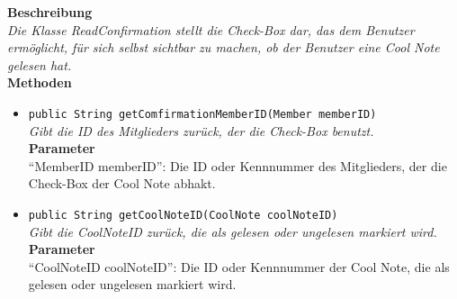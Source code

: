 	\textbf{Beschreibung} \\
	\textit{Die Klasse ReadConfirmation stellt die Check-Box dar, das dem Benutzer ermöglicht, für sich selbst sichtbar zu machen, ob der Benutzer eine Cool Note gelesen hat.} \\
	
	\textbf{Methoden}
	\begin{itemize}
		\item\texttt{{public String getComfirmationMemberID(Member memberID)}}\\
		\textit{Gibt die ID des Mitglieders zurück, der die Check-Box benutzt.}\\
		\textbf{Parameter}\\
		“MemberID memberID”: Die ID oder Kennnummer des Mitglieders, der die Check-Box der Cool Note abhakt.\\
		
		\item\texttt{{public String getCoolNoteID(CoolNote coolNoteID)}}\\
		\textit{Gibt die CoolNoteID zurück, die als gelesen oder ungelesen markiert wird.}\\
		\textbf{Parameter}\\
		“CoolNoteID coolNoteID”: Die ID oder Kennnummer der Cool Note, die als gelesen oder ungelesen markiert wird.\\
	\end{itemize}
